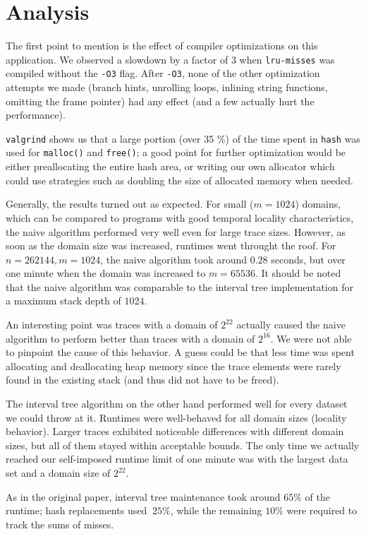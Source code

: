 \documentclass[a4paper,10pt]{article}
\begin{document}
\section{Analysis}

The first point to mention is the effect of compiler optimizations on this application.
We observed a slowdown by a factor of $3$ when \verb|lru-misses| was compiled without the \verb|-O3| flag.
After \verb|-O3|, none of the other optimization attempts we made (branch hints, unrolling loops, inlining
string functions, omitting the frame pointer) had any effect (and a few actually hurt the
performance).

\verb|valgrind| shows us that a large portion (over 35 \%) of the time spent in \verb|hash| was
used for \lstinline|malloc()| and \lstinline|free()|; a good point for
further optimization would be either preallocating the entire hash area, or writing
our own allocator which could use strategies such as doubling the size of allocated
memory when needed.

Generally, the results turned out as expected. For small ($m = 1024$) domains, which can be compared
to programs with good temporal locality characteristics, the naive algorithm performed
very well even for large trace sizes. However, as soon as the domain size was increased,
runtimes went throught the roof. For $n = 262144, m = 1024$, the naive algorithm took around $0.28$ seconds,
but over one minute when the domain was increased to $m = 65536$. It should be noted that the
naive algorithm was comparable to the interval tree implementation for a maximum stack depth of $1024$.

An interesting point was traces with a domain of $2^{22}$ actually caused the naive algorithm
to perform better than traces with a domain of $2^{16}$. We were not able to pinpoint the
cause of this behavior. A guess could be that less time was spent allocating and deallocating
heap memory since the trace elements were rarely found in the existing stack (and thus did
not have to be freed).

The interval tree algorithm on the other hand performed well for every dataset we could throw
at it. Runtimes were well-behaved for all domain sizes (locality behavior). Larger traces 
exhibited noticeable differences  with different domain sizes, but all of them stayed within
acceptable bounds. The only time we actually reached our self-imposed runtime limit of one minute
was with the largest data set and a domain size of $2^{22}$.

As in the original paper, interval tree maintenance took around $65\%$ of the runtime; hash replacements
used $~25\%$, while the remaining $10\%$ were required to track the sums of misses.
\end{document}
